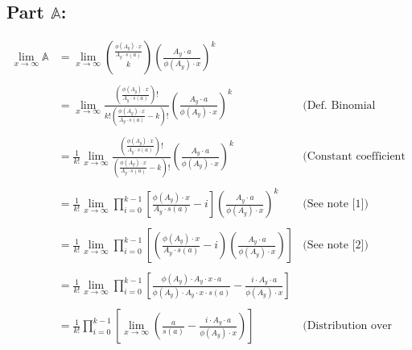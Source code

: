 \documentclass{article}
\theoremstyle{definition}
\begin{document}
\subsection*{Part $\mathbb{A}$:}\begin{align*}
    \lim_{x \to \infty}\mathbb{A} & = \lim_{x \to \infty}{\frac{\phi(A_y) \cdot x}{A_y \cdot s(a)} \choose k } \left(\frac{A_y \cdot a}{\phi(A_y) \cdot x}\right)^k                                                                                                                                     \\\\
                                  & = \lim_{x \to \infty} \frac{\left(\frac{\phi(A_y) \cdot x}{A_y \cdot s(a)}\right)!}{k!\left(\frac{\phi(A_y) \cdot x}{A_y \cdot s(a)} - k \right)!} \left(\frac{A_y \cdot a}{\phi(A_y) \cdot x}\right)^k           & \text{(Def. Binomial Coefficient)}              \\\\
                                  & = \frac{1}{k!}\lim_{x \to \infty} \frac{\left(\frac{\phi(A_y) \cdot x}{A_y \cdot s(a)}\right)!}{\left(\frac{\phi(A_y) \cdot x}{A_y \cdot s(a)} - k \right)!} \left(\frac{A_y \cdot a}{\phi(A_y) \cdot x}\right)^k & \text{(Constant coefficient limit law)}         \\\\
                                  & = \frac{1}{k!}\lim_{x \to \infty} \prod_{i = 0}^{k-1} \left[\frac{\phi(A_y) \cdot x}{A_y \cdot s(a)} - i \right ]\left(\frac{A_y \cdot a}{\phi(A_y) \cdot x}\right)^k                                             & \text{(See note [1])}                           \\\\
                                  & = \frac{1}{k!}\lim_{x \to \infty} \prod_{i = 0}^{k-1} \left[\left(\frac{\phi(A_y) \cdot x}{A_y \cdot s(a)} - i\right)\left(\frac{A_y \cdot a}{\phi(A_y) \cdot x}\right) \right]                                   & \text{(See note [2])}                           \\\\
                                  & = \frac{1}{k!}\lim_{x \to \infty} \prod_{i = 0}^{k-1} \left[\frac{\phi(A_y) \cdot A_y  \cdot x \cdot a}{ \phi(A_y) \cdot A_y \cdot   x \cdot s(a)} - \frac{i \cdot A_y \cdot a }{\phi(A_y) \cdot x}  \right]                                                        \\\\
                                  & = \frac{1}{k!} \prod_{i = 0}^{k-1} \left[\lim_{x \to \infty} \left(   \frac{a}{ s(a)} - \frac{i \cdot A_y \cdot a }{\phi(A_y) \cdot x} \right) \right]                                                            & \text{(Distribution over product limit law)}    \\\\

\end{align*}
\end{document}
